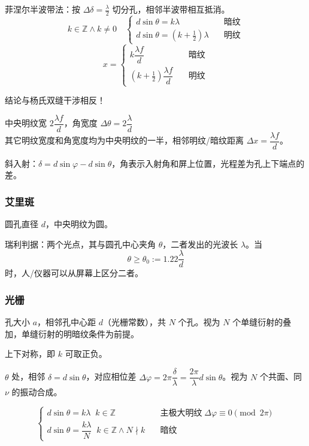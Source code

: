 \documentclass[12pt, a4paper, UTF8, openany]{ctexbook}
\newcommand{\field}[1]{\mathbb{#1}}
\begin{document}
        菲涅尔半波带法：按 $\Delta\delta = \frac{\lambda}{2}$ 切分孔，相邻半波带相互抵消。
        $$k \in \field{Z} \land k \neq 0 \quad \begin{cases}
            d\sin\theta = k \lambda &\quad \text{暗纹}\\
            d\sin\theta = (k + \frac{1}{2}) \lambda &\quad \text{明纹}
        \end{cases}$$
        $$x = \begin{cases}
            k \dfrac{\lambda f}{d} & \quad \text{暗纹} \\
            (k + \frac{1}{2}) \dfrac{\lambda f}{d} & \quad \text{明纹}
        \end{cases}$$

        {\heiti 结论与杨氏双缝干涉相反}！

        中央明纹宽 $2 \dfrac{\lambda f}{d}$，角宽度 $\Delta\theta = 2\dfrac{\lambda}{d}$ \\
        其它明纹宽度和角宽度均为中央明纹的一半，相邻明纹/暗纹距离 $\Delta x = \dfrac{\lambda f}{d}$。

        {\heiti 斜入射}：$\delta = d \sin \varphi - d \sin \theta$，角表示入射角和屏上位置，光程差为孔上下端点的差。

        \subsubsection{艾里斑}
        圆孔直径 $d$，中央明纹为圆。

        瑞利判据：两个光点，其与圆孔中心夹角 $\theta$，二者发出的光波长 $\lambda$。当
        $$\theta \geqslant \theta_0 := 1.22 \frac{\lambda}{d}$$
        时，人/仪器可以从屏幕上区分二者。

        \subsubsection{光栅}
        孔大小 $a$，相邻孔中心距 $d$（光栅常数），共 $N$ 个孔。视为 $N$ 个单缝衍射的叠加，单缝衍射的明暗纹条件为前提。

        上下对称，即 $k$ 可取正负。

        $\theta$ 处，相邻 $\delta = d \sin\theta$，对应相位差 $\Delta\varphi = 2\pi \dfrac{\delta}{\lambda} = \dfrac{2\pi}{\lambda}d\sin\theta$。视为 $N$ 个共面、同 $\nu$ 的振动合成。

        $$\begin{cases}
            d \sin\theta = k \lambda \;\; k \in \field{Z} &\quad\text{主极大明纹} \;\Delta\varphi \equiv 0 \pmod {2\pi} \\
            d \sin\theta = \dfrac{k\lambda}{N} \;\; k \in \field{Z} \land N \nmid k &\quad\text{暗纹}
        \end{cases}$$
\end{document}
